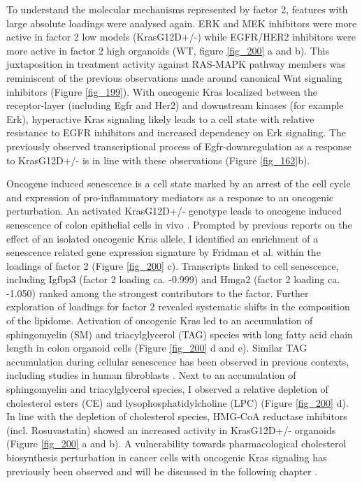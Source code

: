 \begin{flushleft}
To understand the molecular mechanisms represented by factor 2, features with large absolute loadings were analysed again. ERK and MEK inhibitors were more active in factor 2 low models (KrasG12D+/-) while EGFR/HER2 inhibitors were more active in factor 2 high organoids (WT, figure \ref{fig_200} a and b). This juxtaposition in treatment activity against RAS-MAPK pathway members was reminiscent of the previous observations made around canonical Wnt signaling inhibitors (Figure \ref{fig_199}). With oncogenic Kras localized between the receptor-layer (including Egfr and Her2) and downstream kinases (for example Erk), hyperactive Kras signaling likely leads to a cell state with relative resistance to EGFR inhibitors and increased dependency on Erk signaling. The previously observed transcriptional process of Egfr-downregulation as a response to KrasG12D+/- is in line with these observations (Figure \ref{fig_162}b). 

\bigbreak
Oncogene induced senescence is a cell state marked by an arrest of the cell cycle and expression of pro-inflammatory mediators as a response to an oncogenic perturbation. An activated KrasG12D+/- genotype leads to oncogene induced senescence of colon epithelial cells in vivo \cite{Bennecke2010-zf}. Prompted by previous reports on the effect of an isolated oncogenic Kras allele, I identified an enrichment of a senescence related gene expression signature by Fridman et al. within the loadings of factor 2 \cite{Fridman2008-ky} (Figure \ref{fig_200} c). Transcripts linked to cell senescence, including Igfbp3 (factor 2 loading ca. -0.999) and Hmga2 (factor 2 loading ca. -1.050) ranked among the strongest contributors to the factor. Further exploration of loadings for factor 2 revealed systematic shifts in the composition of the lipidome. Activation of oncogenic Kras led to an accumulation of sphingomyelin (SM) and triacylglycerol (TAG) species with long fatty acid chain length in colon organoid cells (Figure \ref{fig_200} d and e). Similar TAG accumulation during cellular senescence has been observed in previous contexts, including studies in human fibroblasts \cite{Lizardo2017-uy}. Next to an accumulation of sphingomyelin and triacylglycerol species, I observed a relative depletion of cholesterol esters (CE) and lysophosphatidylcholine (LPC) (Figure \ref{fig_200} d). In line with the depletion of cholesterol species, HMG-CoA reductase inhibitors (incl. Rosuvastatin) showed an increased activity in KrasG12D+/- organoids (Figure \ref{fig_200} a and b). A vulnerability towards pharmacological cholesterol biosynthesis perturbation in cancer cells with oncogenic Kras signaling has previously been observed and will be discussed in the following chapter \cite{Yu2018-he}. 




\end{flushleft}
